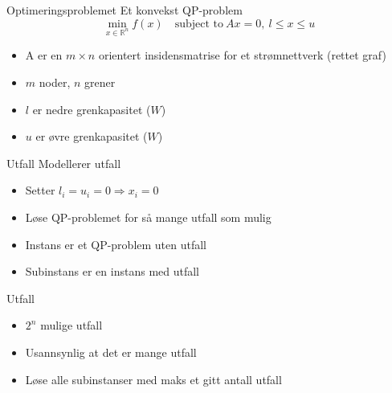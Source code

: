 \documentclass{beamer}
\begin{document}
\begin{frame}{Optimeringsproblemet}
Et konvekst QP-problem
\[
\min_{x \in \mathbb{R}^n} f(x) \quad \textrm{subject to} ~ Ax = 0, ~ l \leq x \leq u
\]
\begin{itemize}
\item A er en $m \times n$ orientert insidensmatrise for et strømnettverk (rettet graf)
\item $m$ noder, $n$ grener
\item $l$ er nedre grenkapasitet ($W$)
\item $u$ er øvre grenkapasitet ($W$)
\end{itemize}
\end{frame}



\begin{frame}{Utfall}
Modellerer utfall
\begin{itemize}
\item Setter $l_i = u_i = 0 \Rightarrow x_i = 0$
\item Løse QP-problemet for så mange utfall som mulig
\item Instans er et QP-problem uten utfall
\item Subinstans er en instans med utfall
\end{itemize}
\end{frame}



\begin{frame}{Utfall}
\begin{itemize}
\item $2^n$ mulige utfall
\item Usannsynlig at det er mange utfall
\item Løse alle subinstanser med maks et gitt antall utfall
\end{itemize}
\end{frame}



\end{document}
